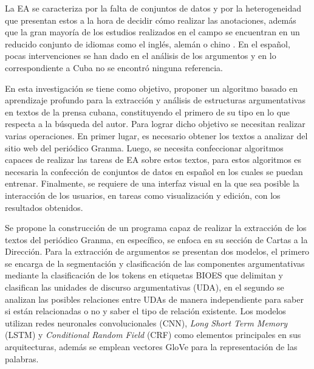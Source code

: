 \documentclass[a4paper,11pt,twocolumn,twoside]{article}
\begin{document}
La EA se caracteriza por la falta de conjuntos de datos y 
por la heterogeneidad que presentan estos a la hora de decidir cómo realizar las 
anotaciones, además que la gran mayoría de los estudios realizados en el campo se encuentran en 
un reducido conjunto de idiomas como el inglés, alemán o chino \cite{eger2018cross}. 
En el español, pocas intervenciones se han dado en el análisis de los argumentos \cite{esteve2020mineria} y en 
lo correspondiente a Cuba no se encontró ninguna referencia. 



En esta investigación se tiene como objetivo, proponer un algoritmo basado en aprendizaje profundo 
para la extracción y análisis de estructuras argumentativas en textos 
de la prensa cubana, constituyendo el primero de su tipo en lo que respecta a la búsqueda del autor. 
Para lograr dicho objetivo se necesitan realizar varias operaciones.
En primer lugar, es necesario obtener los textos a analizar del sitio 
web del periódico Granma. Luego, se necesita confeccionar algoritmos capaces de realizar las tareas 
de EA sobre estos textos, para estos algoritmos es necesaria la confección de conjuntos 
de datos en español en los cuales se puedan entrenar. Finalmente, se requiere de una interfaz visual 
en la que sea posible la interacción de los usuarios, en tareas como visualización y edición, 
con los resultados obtenidos. 

Se propone la construcción de un programa capaz de realizar la extracción de los textos del periódico Granma, 
en específico, se enfoca en su sección de Cartas a la Dirección. Para la extracción
de argumentos se presentan dos modelos, el primero se encarga de la segmentación y clasificación
de las componentes argumentativas mediante la clasificación de los tokens en etiquetas BIOES que 
delimitan y clasifican las unidades de discurso argumentativas (UDA), en el segundo se analizan 
las posibles relaciones entre UDAs de manera independiente para saber si están relacionadas o no y saber
el tipo de relación existente. Los modelos utilizan 
redes neuronales convolucionales (CNN), \textit{Long Short Term Memory} (LSTM) y \textit{Conditional Random Field} (CRF)
como elementos principales en sus arquitecturas, además se emplean vectores GloVe para la representación
de las palabras.
\end{document}
